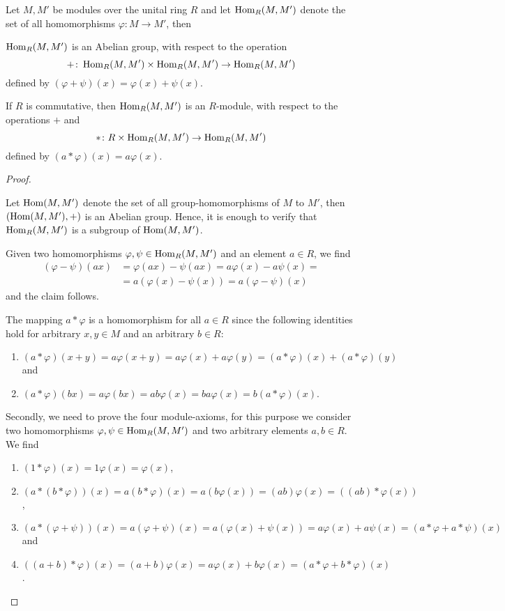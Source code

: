 \begin{pro}\label{prop.Homomorphisms are Module}
Let $M,M'$ be modules over the unital ring $R$ and let $\operatorname{\mathrm{Hom}}_R(M,M')$ denote the set of all homomorphisms $\varphi\colon M\to M'$, then
\begin{thmlist}
\item \label{prop.Homomorphisms are Group} $\operatorname{\mathrm{Hom}}_R(M,M')$ is an Abelian group, with respect to the operation \[+\colon\operatorname{\mathrm{Hom}}_R(M,M')\times\operatorname{\mathrm{Hom}}_R(M,M')\to\operatorname{\mathrm{Hom}}_R(M,M')\]
defined by $(\varphi+\psi)(x)=\varphi(x)+\psi(x)$.
\item If $R$ is commutative, then $\operatorname{\mathrm{Hom}}_R(M,M')$ is an $R$-module, with respect to the operations $+$ and 
\[\ast\colon R\times\operatorname{\mathrm{Hom}}_R(M,M')\to\operatorname{\mathrm{Hom}}_R(M,M')\]
defined by $(a\ast\varphi)(x)=a\varphi(x)$.
\end{thmlist}
\end{pro}
\begin{proof}
\begin{plist}
\item Let $\operatorname{\mathrm{Hom}}(M,M')$ denote the set of all group-ho\-mo\-morph\-isms of $M$ to $M'$, then $(\operatorname{\mathrm{Hom}}(M,M'),+)$ is an Abelian group. Hence, it is enough to verify that $\operatorname{\mathrm{Hom}}_R(M,M')$ is a subgroup of $\operatorname{\mathrm{Hom}}(M,M')$.

Given two homomorphisms $\varphi,\psi\in\operatorname{\mathrm{Hom}}_R(M,M')$ and an element $a\in R$, we find
\begin{align*}
(\varphi-\psi)(ax)&=\varphi(ax)-\psi(ax)=a\varphi(x)-a\psi(x)=\\
            &=a(\varphi(x)-\psi(x))=a(\varphi-\psi)(x)
\end{align*}
and the claim follows.
\item The mapping $a\ast\varphi$ is a homomorphism for all $a\in R$ since the following identities hold for arbitrary $x,y\in M$ and an arbitrary $b\in R$:
\begin{enumerate}
\item $(a\ast\varphi)(x+y)=a\varphi(x+y)=a\varphi(x)+a\varphi(y)=(a\ast\varphi)(x)+(a\ast\varphi)(y)$ and
\item $(a\ast\varphi)(bx)=a\varphi(bx)=ab\varphi(x)=ba\varphi(x)=b(a\ast\varphi)(x)$.
\end{enumerate} 


Secondly, we need to prove the four module-axioms, for this purpose we consider two homomorphisms $\varphi,\psi\in\operatorname{\mathrm{Hom}}_R(M,M')$ and two arbitrary elements $a,b\in R$. We find
\begin{enumerate}
\item $(1\ast\varphi)(x)=1\varphi(x)=\varphi(x)$,
\item $(a\ast(b\ast\varphi))(x)=a(b\ast\varphi)(x)=a(b\varphi(x))=(ab)\varphi(x)=((ab)\ast\varphi(x))$,
\item $(a\ast(\varphi+\psi))(x)=a(\varphi+\psi)(x)=a(\varphi(x)+\psi(x))=a\varphi(x)+a\psi(x)=(a\ast\varphi + a\ast\psi)(x)$ and
\item $((a+b)\ast\varphi)(x)=(a+b)\varphi(x)=a\varphi(x)+b\varphi(x)=(a\ast\varphi+b\ast\varphi)(x)$.
\end{enumerate}
\end{plist}
\end{proof}


